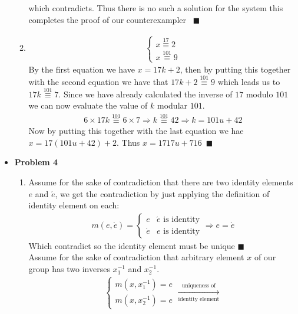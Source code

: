 \documentclass{article}
\begin{document}
\begin{itemize}
\begin{enumerate}[label=(\alph*)]
		which contradicts. Thus there is no such a solution for the system this completes the proof of our counterexampler~ $\blacksquare$
		\item
			\begin{align*}
				\left\{\begin{array}{l}
						x\stackrel{17}{\equiv}2 \\
						x\stackrel{101}{\equiv}9
					\end{array}\right.
			\end{align*}
			By the first equation we have $x=17k+2$, then by putting this together with the second equation 
			we have that $17k+2\stackrel{101}{\equiv}9$ which leads us to $17k\stackrel{101}{\equiv}7$. Since we have already 
			calculated the inverse of $17$ modulo $101$ we can now evaluate the value of $k$ modular $101$.
			\begin{align*}
				6 \times 17k \stackrel{101}{\equiv} 6 \times 7 \Rightarrow k \stackrel{101}{\equiv} 42 \Rightarrow
				k = 101u+42
			\end{align*}
			Now by putting this together with the last equation we hae $x=17(101u+42)+2$. Thus $x=1717u+716$~$\blacksquare$
		\end{enumerate}
	\item{\textcolor{for}{\textbf{Problem 4}}}
		\begin{enumerate}[label=(\alph*)]
			\item Assume for the sake of contradiction that there are two identity elements $e$ and $\acute{e}$, we get the contradiction by just
			  applying the definition of identity element on each:
			  \begin{align*}
				m\left(e,\acute{e}\right) =
				\left\{\begin{array}{ll}
						e & \acute{e}\text{ is identity} \\
						\acute{e} & e \text{ is identity}
					\end{array}\right.
					\Longrightarrow e=\acute{e}
			  \end{align*}
			  Which contradict so the identity element must be unique $\blacksquare$\\[5pt]
			  Assume for the sake of contradiction 
			  that arbitrary element $x$ of our group has two inverses $x_{1}^{-1}$ and $x_{2}^{-1}$.
			  \begin{align*}
				\left\{\begin{array}{ll}
						m(x, x_{1}^{-1}) = e \\
						m(x, x_{2}^{-1}) = e
				\end{array}\right. \xrightarrow[\text{identity element}]{\text{uniqueness of}}

\end{align*}
\end{enumerate}
\end{itemize}
\end{document}
